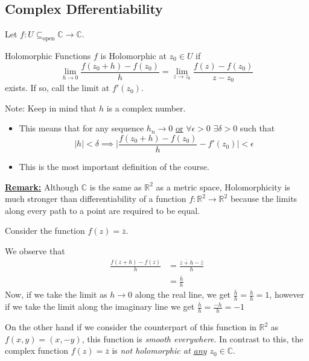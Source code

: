 \documentclass{article}
\newcommand{\R}{\mathbb{R}}
\newcommand{\C}{\mathbb{C}}
\begin{document}
\vskip 1cm
\subsection{Complex Dfferentiability}
Let $f : U \subseteq_{\text{open}} \C \rightarrow \C$.

\begin{mathdefinitionbox}{Holomorphic Functions}
\vskip 0.5cm
  $f$ is Holomorphic at $z_0 \in U$ if \[ \lim_{h \rightarrow 0} \frac{f(z_0 + h) - f(z_0)}{h} = \lim_{z \rightarrow z_0} \frac{f(z) - f(z_0)}{z - z_0} \] exists. If so, call the limit at $f'(z_0)$. 

\vskip 0.5cm
Note: Keep in mind that $h$ is a complex number.
\end{mathdefinitionbox}

\vskip 0.5cm
\begin{itemize}
  \item   This means that for any sequence $h_n \rightarrow 0$ \underline{or} $\forall \epsilon > 0$ $\exists \delta > 0$ such that 
  \[ |h| < \delta \implies \lvert \frac{f(z_0 + h)-f(z_0)}{h} - f'(z_0) \rvert < \epsilon\]

  \item This is the most important definition of the course.
\end{itemize}

\underline{\textbf{Remark:}} Although $\C$ is the same as $\R^2$ as a metric space, Holomorphicity is much stronger than differentiability of a function $f : \R^2 \rightarrow \R^2$ because the limits along every path to a point are required to be equal.

\vskip 0.5cm
 Consider the function $f(z) = \overline{z}$.

\vskip 0.5cm
We observe that 
\begin{align*}
  \frac{f(z+h)-f(z)}{h} &= \frac{\overline{z+h}-\overline{z}}{h} \\
  &= \frac{\overline{h}}{h}
\end{align*}
Now, if we take the limit as $h \rightarrow 0$ along the real line, we get $\frac{\overline{h}}{h} = \frac{h}{h} = 1$, however if we take the limit along 
the imaginary line we get $\frac{\overline{h}}{h} = \frac{-h}{h} = -1$

\vskip 0.5cm
On the other hand if we consider the counterpart of this function in $\R^2$ as 
$f(x, y) = (x, -y)$, this function is \emph{smooth everywhere}. In contrast to this, the complex function $f(z) = \overline{z}$ is \emph{not holomorphic at \underline{any} $z_0 \in \C$}.
\end{document}
